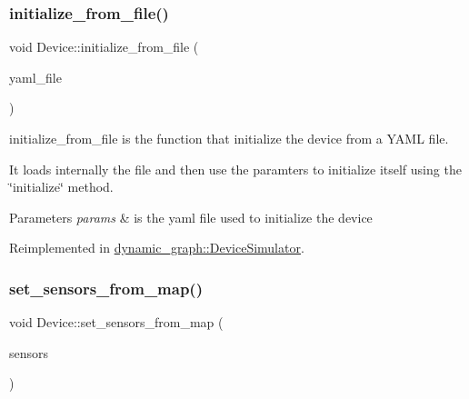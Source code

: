 \subsubsection{\texorpdfstring{initialize\+\_\+from\+\_\+file()}{initialize\_from\_file()}}
{\footnotesize\ttfamily void Device\+::initialize\+\_\+from\+\_\+file (\begin{DoxyParamCaption}\item[{const std\+::string \&}]{yaml\+\_\+file }\end{DoxyParamCaption})\hspace{0.3cm}{\ttfamily [virtual]}}



initialize\+\_\+from\+\_\+file is the function that initialize the device from a Y\+A\+ML file. 

It loads internally the file and then use the paramters to initialize itself using the \char`\"{}initialize\char`\"{} method. 
\begin{DoxyParams}{Parameters}
{\em params} & is the yaml file used to initialize the device \\
\hline
\end{DoxyParams}


Reimplemented in \hyperlink{classdynamic__graph_1_1DeviceSimulator_a8a9370f236ba03162be2472c79f865f2}{dynamic\+\_\+graph\+::\+Device\+Simulator}.

\mbox{\label{classdynamic__graph_1_1Device_ab8dc9a016ebbc34521812a27b5aa6efa}} 
\subsubsection{\texorpdfstring{set\+\_\+sensors\+\_\+from\+\_\+map()}{set\_sensors\_from\_map()}}
{\footnotesize\ttfamily void Device\+::set\+\_\+sensors\+\_\+from\+\_\+map (\begin{DoxyParamCaption}\item[{const \hyperlink{namespacedynamic__graph_a51212ed7fa4ae81e7b362a27f09b7ab8}{Vector\+D\+G\+Map} \&}]{sensors }\end{DoxyParamCaption})\hspace{0.3cm}{\ttfamily [virtual]}}



